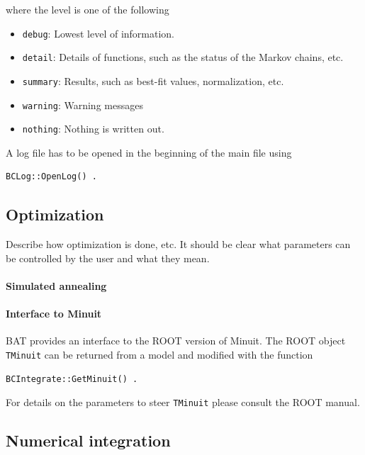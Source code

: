 \documentclass[11pt, a4paper]{article}
\begin{document}
\noindent 
where the level is one of the following 
%
\begin{itemize} 
\item \verb|debug|: Lowest level of information. 
\item \verb|detail|: Details of functions, such as the status of the Markov chains, etc. 
\item \verb|summary|: Results, such as best-fit values, normalization, etc. 
\item \verb|warning|: Warning messages 
\item \verb|nothing|: Nothing is written out. 
\end{itemize} 

A log file has to be opened in the beginning of the main file using 
%
\begin{verbatim} 
BCLog::OpenLog() . 
\end{verbatim} 


\subsection{Optimization} 
\label{subsection:optimization} 

Describe how optimization is done, etc. It should be clear what
parameters can be controlled by the user and what they mean.

\paragraph{Simulated annealing} 

\paragraph{Interface to Minuit} 

BAT provides an interface to the ROOT version of Minuit. The ROOT object 
\verb|TMinuit| can be returned from a model and modified with the function 
%
\begin{verbatim}
BCIntegrate::GetMinuit() . 
\end{verbatim} 

\noindent 
For details on the parameters to steer \verb|TMinuit| please consult the ROOT manual. 


\subsection{Numerical integration} 
\label{subsection:integration} 
\end{document}
